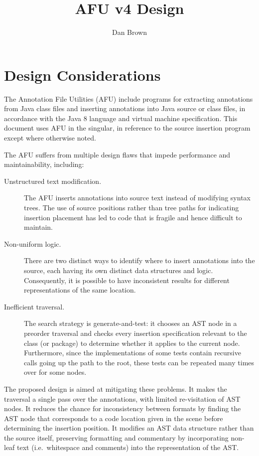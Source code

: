 \documentclass{article}
\title{AFU v4 Design}
\author{Dan Brown}
\begin{document}
\maketitle

\section{Design Considerations}

The Annotation File Utilities (AFU) include programs for extracting
annotations from Java class files and inserting annotations into Java
source or class files, in accordance with the Java 8 language and virtual
machine specification.  This
document uses AFU in the singular, in reference to the source
insertion program except where otherwise noted.

The AFU suffers from multiple design flaws that impede performance and
maintainability, including:

\begin{description}
\item[Unstructured text modification.]  The AFU inserts
annotations into source text instead of modifying syntax trees.
The use of source positions rather than tree paths for indicating
insertion placement has led to code that is fragile and hence difficult
to maintain.
\item[Non-uniform logic.]  There are two distinct ways to
identify where to insert annotations into the source, each having its
own distinct data structures and logic.  Consequently, it is possible to
have inconsistent results for different representations of the same
location.
\item[Inefficient traversal.]  The search strategy is
generate-and-test: it chooses an AST node in a preorder traversal and
checks every insertion specification relevant to the class (or package)
to determine whether it applies to the current node.  Furthermore, since
the implementations of some tests contain recursive calls going up the
path to the root, these tests can be repeated many times over for some
nodes.
\end{description}

The proposed design is aimed at mitigating these problems.  It makes
the traversal a single pass over the annotations, with limited
re-visitation of AST nodes.  It reduces the chance for inconsistency
between formats by finding the AST node that corresponds to a code
location given in the scene before determining the insertion position.
It modifies an AST data structure rather than the source itself,
preserving formatting and commentary by incorporating non-leaf text
(i.e.\ whitespace and comments) into the representation of the AST.
\end{document}
